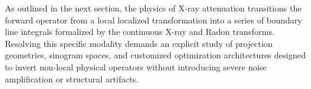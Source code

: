 As outlined in the next section, the physics of X-ray attenuation transitions the forward operator from a local localized transformation into a series of boundary line integrals formalized by the continuous X-ray and Radon transforms. Resolving this specific modality demands an explicit study of projection geometries, sinogram spaces, and customized optimization architectures designed to invert non-local physical operators without introducing severe noise amplification or structural artifacts.
